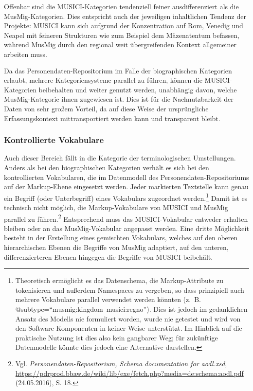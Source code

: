 \documentclass[a4paper,
fontsize=11pt,
oneside,
numbers=noperiodatend,
parskip=half-,
bibliography=totoc,
final
]{scrartcl}
\begin{document}
Offenbar sind die MUSICI-Kategorien tendenziell feiner ausdifferenziert
als die MusMig-Kategorien. Dies entspricht auch der jeweiligen
inhaltlichen Tendenz der Projekte: MUSICI kann sich aufgrund der
Konzentration auf Rom, Venedig und Neapel mit feineren Strukturen wie
zum Beispiel dem Mäzenatentum befassen, während MusMig durch den
regional weit übergreifenden Kontext allgemeiner arbeiten muss.

Da das Personendaten-Repositorium im Falle der biographischen Kategorien
erlaubt, mehrere Kategoriensysteme parallel zu führen, können die
MUSICI-Kategorien beibehalten und weiter genutzt werden, unabhängig
davon, welche MusMig-Kategorie ihnen zugewiesen ist. Dies ist für die
Nachnutzbarkeit der Daten von sehr großem Vorteil, da auf diese Weise
der ursprüngliche Erfassungskontext mittransportiert werden kann und
transparent bleibt.

\subsubsection*{Kontrollierte Vokabulare}\label{kontrollierte-vokabulare}

Auch dieser Bereich fällt in die Kategorie der terminologischen
Umstellungen. Anders als bei den biographischen Kategorien verhält es
sich bei den kontrollierten Vokabularen, die im Datenmodell des
Personendaten-Repositoriums auf der Markup-Ebene eingesetzt werden.
Jeder markierten Textstelle kann genau ein Begriff (oder Unterbegriff)
eines Vokabulars zugeordnet werden.\footnote{Theoretisch ermöglicht es
  das Datenschema, die Markup-Attribute zu tokenisieren und außerdem
  Namespaces zu vergeben, so dass prinzipiell auch mehrere Vokabulare
  parallel verwendet werden könnten (z.~B.
  @subtype=\enquote{musmig:kingdom~musici:regno}). Dies ist jedoch im
  gedanklichen Ansatz des Modells nie formuliert worden, wurde nie
  getestet und wird von den Software-Komponenten in keiner Weise
  unterstützt. Im Hinblick auf die praktische Nutzung ist dies also kein
  gangbarer Weg; für zukünftige Datenmodelle könnte dies jedoch eine
  Alternative darstellen.} Damit ist es technisch nicht möglich, die
Markup-Vokabulare von MUSICI und MusMig parallel zu führen.\footnote{Vgl.
  \emph{Personendaten-Repositorium, Schema documentation for aodl.xsd},
  \url{https://pdrprod.bbaw.de/wiki/lib/exe/fetch.php?media=de:schema:aodl.pdf}
  (24.05.2016), S. 18.} Entsprechend muss das MUSICI-Vokabular entweder
erhalten bleiben oder an das MusMig-Vokabular angepasst werden. Eine
dritte Möglichkeit besteht in der Erstellung eines gemischten
Vokabulars, welches auf den oberen hierarchischen Ebenen die Begriffe
von MusMig adaptiert, auf den unteren, differenzierteren Ebenen hingegen
die Begriffe von MUSICI beibehält.
\end{document}

